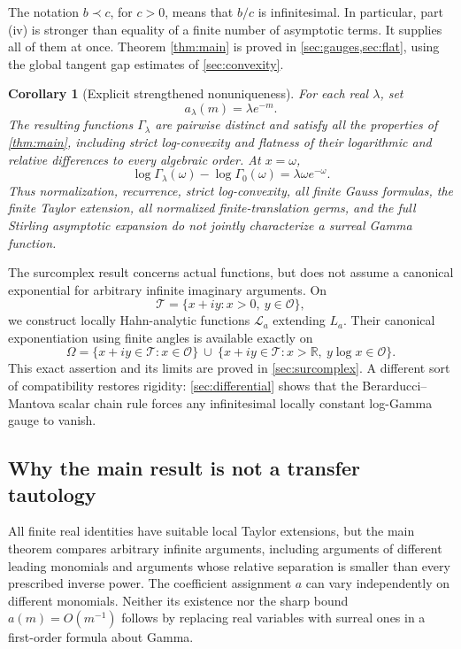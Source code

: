 \documentclass[11pt,letterpaper]{article}
\numberwithin{equation}{section}
\theoremstyle{plain}
\newtheorem{corollary}[corollary]{Corollary}
\theoremstyle{definition}
\theoremstyle{remark}
\newcommand{\R}{\mathbb R}
\newcommand{\Ocal}{\mathcal O}
\newcommand{\tube}{\mathcal T}
\newcommand{\Lt}{\mathcal L}
\begin{document}
The notation $b\prec c$, for $c>0$, means that $b/c$ is infinitesimal.
In particular, part (iv) is stronger than equality of a finite number of
asymptotic terms. It supplies all of them at once. Theorem
\ref{thm:main} is proved in \cref{sec:gauges,sec:flat}, using the global tangent
gap estimates of \cref{sec:convexity}.

\begin{corollary}[Explicit strengthened nonuniqueness]\label{cor:headline}
For each real $\lambda$, set
\begin{equation}\label{eq:explicit-gauge}
 a_\lambda(m)=\lambda e^{-m}.
\end{equation}
The resulting functions $\Gamma_\lambda$ are pairwise distinct and satisfy
all the properties of \cref{thm:main}, including strict log-convexity and
flatness of their logarithmic and relative differences to every algebraic
order. At $x=\omega$,
\begin{equation}\label{eq:omega-value}
 \log\Gamma_\lambda(\omega)-\log\Gamma_0(\omega)
 =\lambda\omega e^{-\omega}.
\end{equation}
Thus normalization, recurrence, strict log-convexity, all finite Gauss
formulas, the finite Taylor extension, all normalized finite-translation
germs, and the full Stirling asymptotic expansion do not jointly characterize
a surreal Gamma function.
\end{corollary}

The surcomplex result concerns actual functions, but does not assume a
canonical exponential for arbitrary infinite imaginary arguments. On
\[
 \tube=\{x+iy:x>0,\ y\in\Ocal\},
\]
we construct locally Hahn-analytic functions $\Lt_a$ extending $L_a$.
Their canonical exponentiation using finite angles is available exactly on
\begin{equation}\label{eq:omega-domain-intro}
 \Omega=\{x+iy\in\tube:x\in\Ocal\}
 \ \cup\
 \{x+iy\in\tube:x>\R,\ y\log x\in\Ocal\}.
\end{equation}
This exact assertion and its limits are proved in
\cref{sec:surcomplex}. A different sort of compatibility restores rigidity:
\cref{sec:differential} shows that the Berarducci--Mantova scalar chain rule
forces any infinitesimal locally constant log-Gamma gauge to vanish.

\subsection{Why the main result is not a transfer tautology}
All finite real identities have suitable local Taylor extensions, but the
main theorem compares arbitrary infinite arguments, including arguments of
different leading monomials and arguments whose relative separation is
smaller than every prescribed inverse power. The coefficient assignment $a$
can vary independently on different monomials. Neither its existence nor the
sharp bound $a(m)=O(m^{-1})$ follows by replacing real variables with surreal
ones in a first-order formula about Gamma.
\end{document}
